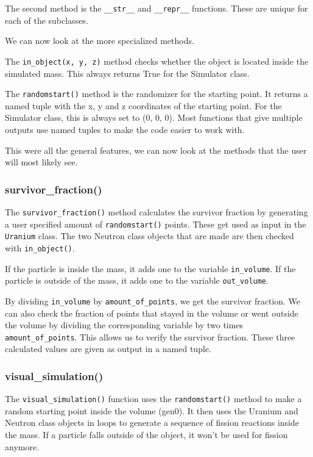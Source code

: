 The second method is the \lstinline[language=PythonPlus, style=colorEX]|__str__| and \lstinline[language=PythonPlus, style=colorEX]|__repr__| functions. These are unique for each of the subclasses.

We can now look at the more specialized methods.

The \lstinline[language=PythonPlus, style=colorEX]|in_object(x, y, z)| method checks whether the object is located inside the simulated mass. This always returns True for the Simulator class.

The \lstinline[language=PythonPlus, style=colorEX]|randomstart()| method is the randomizer for the starting point. It returns a named tuple with the x, y and z coordinates of the starting point. For the Simulator class, this is always set to (0, 0, 0). Most functions that give multiple outputs use named tuples to make the code easier to work with.

This were all the general features, we can now look at the methods that the user will most likely see.

\subsubsection{survivor\_fraction()}
The \lstinline[language=PythonPlus, style=colorEX]|survivor_fraction()| method calculates the survivor fraction by generating a user specified amount of \lstinline[language=PythonPlus, style=colorEX]|randomstart()| points. These get used as input in the \lstinline[language=PythonPlus, style=colorEX]|Uranium| class. The two Neutron class objects that are made are then checked with \lstinline[language=PythonPlus, style=colorEX]|in_object()|.

If the particle is inside the mass, it adds one to the variable \lstinline[language=PythonPlus, style=colorEX]|in_volume|. If the particle is outside of the mass, it adds one to the variable \lstinline[language=PythonPlus, style=colorEX]|out_volume|. 

By dividing \lstinline[language=PythonPlus, style=colorEX]|in_volume| by \lstinline[language=PythonPlus, style=colorEX]|amount_of_points|, we get the survivor fraction. We can also check the fraction of points that stayed in the volume or went outside the volume by dividing the corresponding variable by two times \lstinline[language=PythonPlus, style=colorEX]|amount_of_points|. This allows us to verify the survivor fraction. These three calculated values are given as output in a named tuple.
\subsubsection{visual\_simulation()}
The \lstinline[language=PythonPlus, style=colorEX]|visual_simulation()| function uses the \lstinline[language=PythonPlus, style=colorEX]|randomstart()| method to make a random starting point inside the volume (gen0). 
It then uses the Uranium and Neutron class objects in loops to generate a sequence of fission reactions inside the mass. If a particle falls outside of the object, it won't be used for fission anymore.

